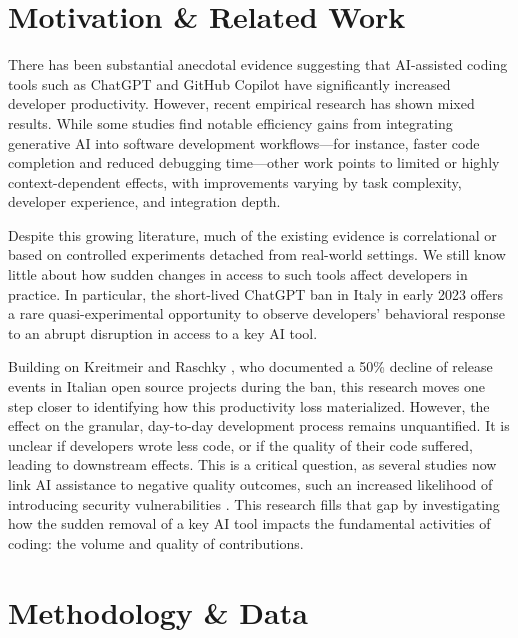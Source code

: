 \section*{Motivation \& Related Work}

There has been substantial anecdotal evidence suggesting that AI-assisted coding tools such as ChatGPT \cite{openai_chatgpt} and GitHub Copilot have significantly increased developer productivity. However, recent empirical research has shown mixed results\cite{cui2025the, paradis2024doesaiimpactdevelopment, peng2023impactaideveloperproductivity}. While some studies find notable efficiency gains from integrating generative AI into software development workflows—for instance, faster code completion and reduced debugging time—other work points to limited or highly context-dependent effects, with improvements varying by task complexity, developer experience, and integration depth.

Despite this growing literature, much of the existing evidence is correlational or based on controlled experiments detached from real-world settings. We still know little about how sudden changes in access to such tools affect developers in practice. In particular, the short-lived ChatGPT ban in Italy in early 2023 \cite{garante_ban_2023} offers a rare quasi-experimental opportunity to observe developers’ behavioral response to an abrupt disruption in access to a key AI tool.

Building on Kreitmeir and Raschky \cite{Kreitmeir2023}, who documented a 50\% decline of release events in Italian open source projects during the ban, this research moves one step closer to identifying how this productivity loss materialized. However, the effect on the granular, day-to-day development process remains unquantified. It is unclear if developers wrote less code, or if the quality of their code suffered, leading to downstream effects. This is a critical question, as several studies now link AI assistance to negative quality outcomes, such an increased likelihood of introducing security vulnerabilities \cite{fu2025securityweaknessescopilotgeneratedcode, pearce2021asleepkeyboardassessingsecurity}. This research fills that gap by investigating how the sudden removal of a key AI tool impacts the fundamental activities of coding: the volume and quality of contributions.


\section*{Methodology \& Data}

